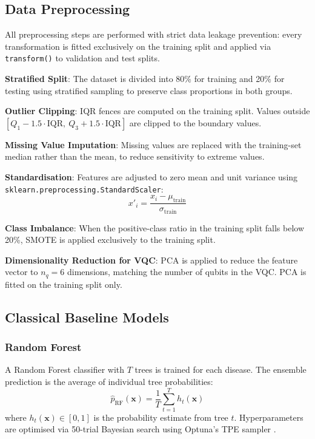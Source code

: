 ﻿\documentclass[conference]{IEEEtran}
\begin{document}
\subsection{Data Preprocessing}

All preprocessing steps are performed with strict data leakage prevention: every
transformation is fitted exclusively on the training split and applied via
\texttt{transform()} to validation and test splits.

\textbf{Stratified Split}: The dataset is divided into 80\% for training and 20\% for
testing using stratified sampling to preserve class proportions in both groups.

\textbf{Outlier Clipping}: IQR fences are computed on the training split. Values outside
$[Q_1 - 1.5 \cdot \text{IQR},\ Q_3 + 1.5 \cdot \text{IQR}]$ are clipped to the
boundary values.

\textbf{Missing Value Imputation}: Missing values are replaced with the training-set
median rather than the mean, to reduce sensitivity to extreme values.

\textbf{Standardisation}: Features are adjusted to zero mean and unit variance using
\texttt{sklearn.preprocessing.StandardScaler}:
\begin{equation}
    x'_i = \frac{x_i - \mu_{\text{train}}}{\sigma_{\text{train}}}
    \label{eq:standardscaler}
\end{equation}

\textbf{Class Imbalance}: When the positive-class ratio in the training split falls below
20\%, SMOTE \cite{chawla2002smote} is applied exclusively to the training split.

\textbf{Dimensionality Reduction for VQC}: PCA is applied to reduce the feature vector
to $n_q = 6$ dimensions, matching the number of qubits in the VQC. PCA is fitted on the
training split only.

\subsection{Classical Baseline Models}

\subsubsection{Random Forest}

A Random Forest classifier \cite{breiman2001rf} with $T$ trees is trained for each
disease. The ensemble prediction is the average of individual tree probabilities:
\begin{equation}
    \hat{p}_{\text{RF}}(\mathbf{x}) = \frac{1}{T} \sum_{t=1}^{T} h_t(\mathbf{x})
    \label{eq:rf}
\end{equation}
where $h_t(\mathbf{x}) \in [0,1]$ is the probability estimate from tree $t$.
Hyperparameters are optimised via 50-trial Bayesian search using Optuna's TPE sampler
\cite{akiba2019optuna}.
\end{document}
